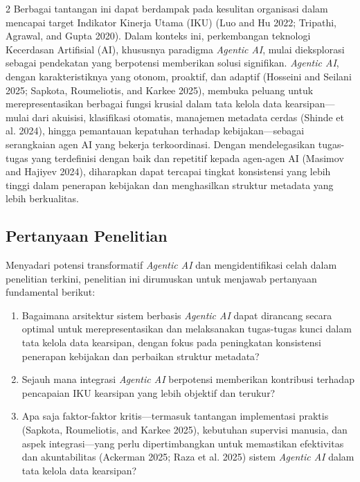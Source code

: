 \documentclass[12pt,a4paper]{article}
\begin{document}
\begin{multicols}{2}
Berbagai tantangan ini dapat berdampak pada kesulitan organisasi dalam mencapai target Indikator Kinerja Utama (IKU) (Luo and Hu 2022; Tripathi, Agrawal, and Gupta 2020). Dalam konteks ini, perkembangan teknologi Kecerdasan Artifisial (AI), khususnya paradigma \emph{Agentic AI}, mulai dieksplorasi sebagai pendekatan yang berpotensi memberikan solusi signifikan. \emph{Agentic AI}, dengan karakteristiknya yang otonom, proaktif, dan adaptif (Hosseini and Seilani 2025; Sapkota, Roumeliotis, and Karkee 2025), membuka peluang untuk merepresentasikan berbagai fungsi krusial dalam tata kelola data kearsipan---mulai dari akuisisi, klasifikasi otomatis, manajemen metadata cerdas (Shinde et al. 2024), hingga pemantauan kepatuhan terhadap kebijakan---sebagai serangkaian agen AI yang bekerja terkoordinasi. Dengan mendelegasikan tugas-tugas yang terdefinisi dengan baik dan repetitif kepada agen-agen AI (Masimov and Hajiyev 2024), diharapkan dapat tercapai tingkat konsistensi yang lebih tinggi dalam penerapan kebijakan dan menghasilkan struktur metadata yang lebih berkualitas.

\subsection{Pertanyaan Penelitian}

Menyadari potensi transformatif \emph{Agentic AI} dan mengidentifikasi celah dalam penelitian terkini, penelitian ini dirumuskan untuk menjawab pertanyaan fundamental berikut:

\begin{enumerate}
\item Bagaimana arsitektur sistem berbasis \emph{Agentic AI} dapat dirancang secara optimal untuk merepresentasikan dan melaksanakan tugas-tugas kunci dalam tata kelola data kearsipan, dengan fokus pada peningkatan konsistensi penerapan kebijakan dan perbaikan struktur metadata?

\item Sejauh mana integrasi \emph{Agentic AI} berpotensi memberikan kontribusi terhadap pencapaian IKU kearsipan yang lebih objektif dan terukur?

\item Apa saja faktor-faktor kritis---termasuk tantangan implementasi praktis (Sapkota, Roumeliotis, and Karkee 2025), kebutuhan supervisi manusia, dan aspek integrasi---yang perlu dipertimbangkan untuk memastikan efektivitas dan akuntabilitas (Ackerman 2025; Raza et al. 2025) sistem \emph{Agentic AI} dalam tata kelola data kearsipan?
\end{enumerate}


\end{multicols}
\end{document}
